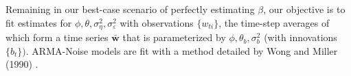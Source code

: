 
Remaining in our best-case scenario of perfectly estimating $\beta$, our objective is to fit estimates for $\phi,\theta,\sigma_\eta^2,\sigma_\varepsilon^2$ with observations $\{w_{ti}\}$, the time-step averages of which form a time series $\bar{\mathbf{w}}$ that is parameterized by $\phi, \theta_b, \sigma_b^2$ (with innovations $\{b_t\})$. ARMA-Noise models are fit with a method detailed by Wong and Miller (1990) \cite{WongMiller1990}.
